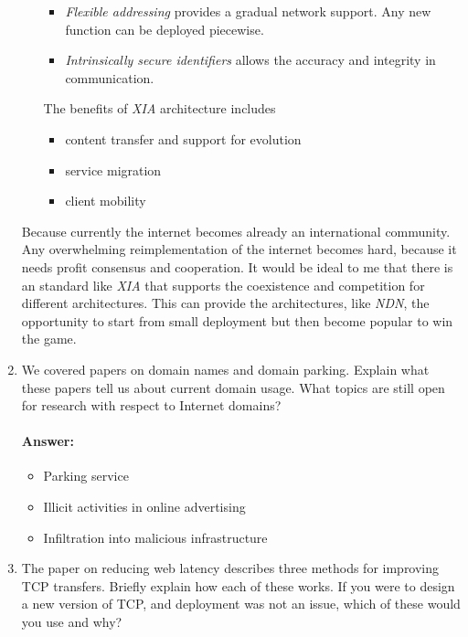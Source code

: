 \documentclass[a4paper,11pt]{article}
\theoremstyle{mytheor}
\begin{document}
\begin{enumerate}
\begin{itemize}
\begin{itemize}
\item \emph{Flexible addressing} provides a gradual network support.
Any new function can be deployed piecewise.
\item \emph{Intrinsically secure identifiers} allows the accuracy and integrity in communication.
\end{itemize}
The benefits of \emph{XIA} architecture includes
\begin{itemize}
	\item content transfer and support for evolution
	\item service migration
	\item client mobility
\end{itemize}
\end{itemize}

Because currently the internet becomes already an international community.
Any overwhelming reimplementation of the internet becomes hard, because it needs profit consensus and cooperation.
It would be ideal to me that there is an standard like \emph{XIA} that supports the coexistence and competition for different architectures.
This can provide the architectures, like \emph{NDN}, the opportunity to start from small deployment but then become popular to win the game.

\item 
We covered papers on domain names and domain parking. 
Explain what these papers tell us about current domain usage. 
What topics are still open for research with respect to Internet domains?
\paragraph{Answer:}
\begin{itemize}
\item Parking service
\item Illicit activities in online advertising
\item Infiltration into malicious infrastructure
\end{itemize}
\begin{comment}
\item 
The paper on SSL, HTTPS, and trust models describes a number of flaws with our system for secure communication. 
Choose three of these you feel are most important. 
Describe the aw and explain why this is a critical area where improvement is needed.
\paragraph{Answer:}
xx
\end{comment}
\item
The paper on reducing web latency describes three methods for improving TCP transfers. 
Briefly explain how each of these works. 
If you were to design a new version of TCP, and deployment was not an issue, which of these would you use and why?

\end{enumerate}
\end{document}

